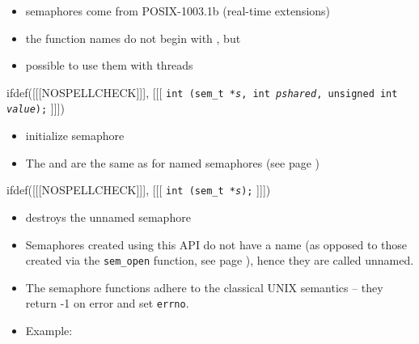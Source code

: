 \begin{slide}
\begin{itemize}
\item semaphores come from POSIX-1003.1b (real-time extensions)
\item the function names do not begin with ,
but 
\item possible to use them with threads
\end{itemize}
ifdef([[[NOSPELLCHECK]]], [[[
\texttt{int (sem\_t *\emph{s},
int \emph{pshared}, unsigned int \emph{value});}
]]])
\begin{itemize}
\item initialize semaphore
\item The  and  are the same as for named
semaphores (see page \pageref{NAMED_SEMAPHORES})
\end{itemize}
ifdef([[[NOSPELLCHECK]]], [[[
\texttt{int (sem\_t *\emph{s});}
]]])
\begin{itemize}
\item destroys the unnamed semaphore
\end{itemize}
\end{slide}

\begin{itemize}
\item Semaphores created using this API do not have a name (as opposed to
those created via the \texttt{sem\_open} function,
see page \pageref{NAMED_SEMAPHORES}), hence they are called unnamed.
\item The semaphore functions adhere to the classical UNIX semantics --
they return -1 on error and set \texttt{errno}.
\item Example: 
\end{itemize}


